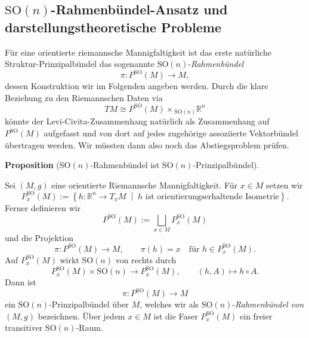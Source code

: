 \documentclass[10pt, letterpaper]{article}
\newcommand{\R}{\mathbb{R}}
\newcommand{\SO}{\mathrm{SO}}
\newcommand{\CustomHeading}[3]{%
  \par\medskip\noindent%
  \textbf{#1 #2} \textnormal{(#3)}.\enskip%
}
\newenvironment{PROP}[2]{\CustomHeading{Proposition}{#1}{#2}}{}
\begin{document}
\subsection{$\SO(n)$-Rahmenbündel-Ansatz und darstellungstheoretische Probleme}


Für eine orientierte riemannsche Mannigfaltigkeit ist das erste natürliche
Struktur-Prinzipalbündel das sogenannte \(\SO(n)\)-\emph{Rahmenbündel}
\[
\pi:P^{\SO}(M)\to M,
\]
dessen Konstruktion wir im Folgenden angeben werden. Durch die klare Beziehung zu den Riemannschen Daten via 
$$T M \cong P^{\mathrm{SO}}(M) \times{ }_{\mathrm{SO}(n)} \mathbb{R}^n$$
könnte der Levi-Civita-Zusammenhang natürlich als Zusammenhang auf \(P^{\SO}(M)\)
aufgefasst und von dort auf jedes zugehörige assoziierte Vektorbündel
übertragen werden. Wir müssten dann also noch das Abstiegsproblem prüfen.



\begin{PROP}{}{$\SO(n)$-Rahmenbündel ist $\SO(n)$-Prinzipalbündel}
Sei $(M,g)$ eine orientierte Riemannsche Mannigfaltigkeit. Für \(x\in M\) setzen wir
\[
P_x^{\SO}(M)
:=
\left\{
h:\R^n\to T_xM
\;\middle|\;
h \text{ ist orientierungserhaltende Isometrie}
\right\}.
\]
Ferner definieren wir
\[
P^{\SO}(M):=\bigsqcup_{x\in M} P_x^{\SO}(M)
\]
und die Projektion
\[
\pi:P^{\SO}(M)\to M,\qquad \pi(h)=x
\quad\text{für }h\in P_x^{\SO}(M).
\]
Auf \(P_x^{\SO}(M)\) wirkt \(\SO(n)\) von rechts durch
\[
P_x^{\SO}(M)\times \SO(n)\to P_x^{\SO}(M),
\qquad
(h,A)\mapsto h\circ A.
\]
Dann ist
\[
\pi:P^{\SO}(M)\to M
\]
ein \(\SO(n)\)-Prinzipalbündel über $M$, welches wir als $\SO(n)$-\emph{Rahmenbündel von $(M,g)$} bezeichnen. Über jedem \(x\in M\) ist die Faser \(P_x^{\SO}(M)\) ein freier transitiver \(\SO(n)\)-Raum.
\end{PROP}
\end{document}
